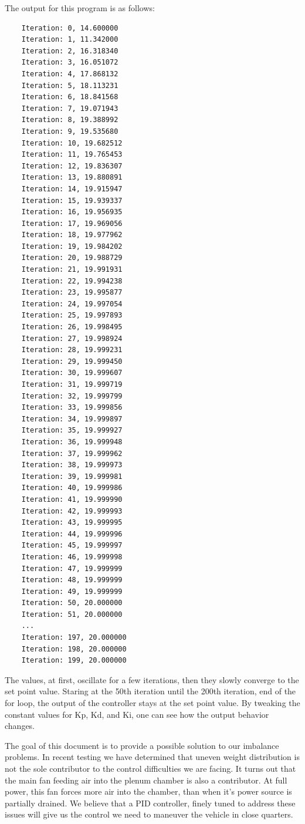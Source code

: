 The output for this program is as follows:
\begin{verbatim}
	Iteration: 0, 14.600000
	Iteration: 1, 11.342000
	Iteration: 2, 16.318340
	Iteration: 3, 16.051072
	Iteration: 4, 17.868132
	Iteration: 5, 18.113231
	Iteration: 6, 18.841568
	Iteration: 7, 19.071943
	Iteration: 8, 19.388992
	Iteration: 9, 19.535680
	Iteration: 10, 19.682512
	Iteration: 11, 19.765453
	Iteration: 12, 19.836307
	Iteration: 13, 19.880891
	Iteration: 14, 19.915947
	Iteration: 15, 19.939337
	Iteration: 16, 19.956935
	Iteration: 17, 19.969056
	Iteration: 18, 19.977962
	Iteration: 19, 19.984202
	Iteration: 20, 19.988729
	Iteration: 21, 19.991931
	Iteration: 22, 19.994238
	Iteration: 23, 19.995877
	Iteration: 24, 19.997054
	Iteration: 25, 19.997893
	Iteration: 26, 19.998495
	Iteration: 27, 19.998924
	Iteration: 28, 19.999231
	Iteration: 29, 19.999450
	Iteration: 30, 19.999607
	Iteration: 31, 19.999719
	Iteration: 32, 19.999799
	Iteration: 33, 19.999856
	Iteration: 34, 19.999897
	Iteration: 35, 19.999927
	Iteration: 36, 19.999948
	Iteration: 37, 19.999962
	Iteration: 38, 19.999973
	Iteration: 39, 19.999981
	Iteration: 40, 19.999986
	Iteration: 41, 19.999990
	Iteration: 42, 19.999993
	Iteration: 43, 19.999995
	Iteration: 44, 19.999996
	Iteration: 45, 19.999997
	Iteration: 46, 19.999998
	Iteration: 47, 19.999999
	Iteration: 48, 19.999999
	Iteration: 49, 19.999999
	Iteration: 50, 20.000000
	Iteration: 51, 20.000000
	...
	Iteration: 197, 20.000000
	Iteration: 198, 20.000000
	Iteration: 199, 20.000000
\end{verbatim}

The values, at first, oscillate for a few iterations, then they slowly converge to the set point value. Staring at the 50th iteration until the 200th iteration, end of the for loop, the output of the controller stays at the set point value. By tweaking the constant values for Kp, Kd, and Ki, one can see how the output behavior changes. 

The goal of this document is to provide a possible solution to our imbalance problems. In recent testing we have determined that uneven weight distribution is not the sole contributor to the control difficulties we are facing. It turns out that the main fan feeding air into the plenum chamber is also a contributor. At full power, this fan forces more air into the chamber, than when it's power source is partially drained. We believe that a PID controller, finely tuned to address these issues will give us the control we need to maneuver the vehicle in close quarters.
